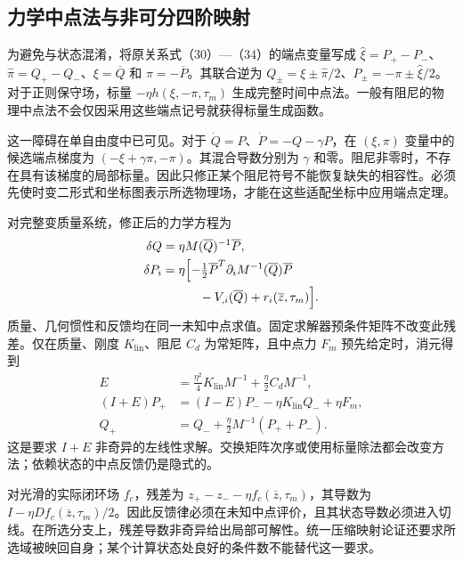 \subsection{力学中点法与非可分四阶映射}
为避免与状态混淆，将原关系式（30）—（34）的端点变量写成 $\widehat\xi=P_+-P_-$、$\widehat\pi=Q_+-Q_-$、$\xi=\overline Q$ 和 $\pi=-\overline P$。其联合逆为 $Q_\pm=\xi\pm\widehat\pi/2$、$P_\pm=-\pi\pm\widehat\xi/2$。对于正则保守场，标量 $-\eta h(\xi,-\pi,\tau_m)$ 生成完整时间中点法。一般有阻尼的物理中点法不会仅因采用这些端点记号就获得标量生成函数。

这一障碍在单自由度中已可见。对于 $\dot Q=P$、$\dot P=-Q-\gamma P$，在 $(\xi,\pi)$ 变量中的候选端点梯度为 $(-\xi+\gamma\pi,-\pi)$。其混合导数分别为 $\gamma$ 和零。阻尼非零时，不存在具有该梯度的局部标量。因此只修正某个阻尼符号不能恢复缺失的相容性。必须先使时变二形式和坐标图表示所选物理场，才能在这些适配坐标中应用端点定理。

对完整变质量系统，修正后的力学方程为
\begin{equation}
 \begin{aligned}
 \delta Q&=\eta M(\overline Q)^{-1}\overline P,\\
 \delta P_i&=\eta\Bigl[-\tfrac12\overline P^T
                  \partial_iM^{-1}(\overline Q)\overline P\\
 &\hspace{3em}-V_{,i}(\overline Q)+r_i(\overline z,\tau_m)\Bigr].
\end{aligned}
 \label{eq:th-mechanical-midpoint}
\end{equation}
质量、几何惯性和反馈均在同一未知中点求值。固定求解器预条件矩阵不改变此残差。仅在质量、刚度 $K_{\mathrm{lin}}$、阻尼 $C_d$ 为常矩阵，且中点力 $F_m$ 预先给定时，消元得到
\begin{equation}
 \begin{aligned}
 E&=\tfrac{\eta^2}{4}K_{\mathrm{lin}}M^{-1}+\tfrac\eta2 C_dM^{-1},\\
 (I+E)P_+&=(I-E)P_- -\eta K_{\mathrm{lin}}Q_-+\eta F_m,\\
 Q_+&=Q_-+\tfrac\eta2 M^{-1}(P_++P_-).
 \end{aligned}
 \label{eq:th-leftsolve}
\end{equation}
这是要求 $I+E$ 非奇异的左线性求解。交换矩阵次序或使用标量除法都会改变方法；依赖状态的中点反馈仍是隐式的。

对光滑的实际闭环场 $f_c$，残差为 $z_+-z_- -\eta f_c(\overline z,\tau_m)$，其导数为 $I-\eta Df_c(\overline z,\tau_m)/2$。因此反馈律必须在未知中点评价，且其状态导数必须进入切线。在所选分支上，残差导数非奇异给出局部可解性。统一压缩映射论证还要求所选域被映回自身；某个计算状态处良好的条件数不能替代这一要求。

